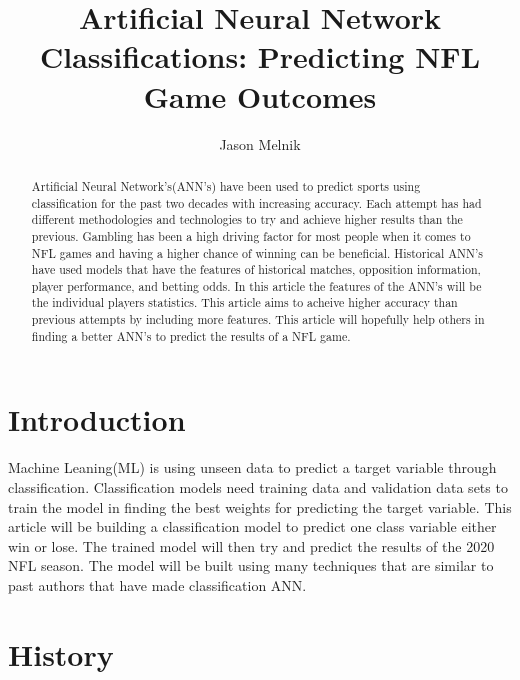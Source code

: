 \documentclass[12pt]{IEEEtran}
\begin{document}
\title{Artificial Neural Network Classifications: Predicting NFL Game Outcomes}

\author{Jason Melnik}
\maketitle

\begin{abstract}
	Artificial Neural Network's(ANN's) have been used to predict sports using classification for the past two decades with increasing accuracy. Each attempt has had different methodologies and technologies to try and achieve higher results than the previous. Gambling has been a high driving factor for most people when it comes to NFL games and having a higher chance of winning can be beneficial. Historical ANN's have used models that have the features of historical matches, opposition information, player performance, and betting odds. In this article the features of the ANN's will be the individual players statistics. This article aims to acheive higher accuracy than previous attempts by including more features. This article will hopefully help others in finding a better ANN's to predict the results of a NFL game.
\end{abstract}

\section{Introduction}
	Machine Leaning(ML) is using unseen data to predict a target variable through classification. Classification models need training data and validation data sets to train the model in finding the best weights for predicting the target variable. This article will be building a classification model to predict one class variable either win or lose. The trained model will then try and predict the results of the 2020 NFL season. The model will be built using many techniques that are similar to past authors that have made classification ANN.

\section{History}
\end{document}
